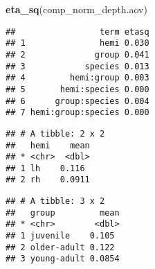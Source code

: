 \documentclass[
]{article}
\newenvironment{Shaded}{\begin{snugshade}}{\end{snugshade}}
\newcommand{\CommentTok}[1]{\textcolor[rgb]{0.56,0.35,0.01}{\textit{#1}}}
\newcommand{\DataTypeTok}[1]{\textcolor[rgb]{0.13,0.29,0.53}{#1}}
\newcommand{\KeywordTok}[1]{\textcolor[rgb]{0.13,0.29,0.53}{\textbf{#1}}}
\newcommand{\NormalTok}[1]{#1}
\newcommand{\OperatorTok}[1]{\textcolor[rgb]{0.81,0.36,0.00}{\textbf{#1}}}
\newcommand{\StringTok}[1]{\textcolor[rgb]{0.31,0.60,0.02}{#1}}
\begin{document}
\begin{Shaded}
\begin{Highlighting}[]
\KeywordTok{eta_sq}\NormalTok{(comp_norm_depth.aov)}
\end{Highlighting}
\end{Shaded}

\begin{verbatim}
##                 term etasq
## 1               hemi 0.030
## 2              group 0.041
## 3            species 0.013
## 4         hemi:group 0.003
## 5       hemi:species 0.000
## 6      group:species 0.004
## 7 hemi:group:species 0.000
\end{verbatim}

\begin{Shaded}
\end{Shaded}

\begin{verbatim}
## # A tibble: 2 x 2
##   hemi    mean
## * <chr>  <dbl>
## 1 lh    0.116 
## 2 rh    0.0911
\end{verbatim}

\begin{Shaded}
\end{Shaded}

\begin{verbatim}
## # A tibble: 3 x 2
##   group         mean
## * <chr>        <dbl>
## 1 juvenile    0.105 
## 2 older-adult 0.122 
## 3 young-adult 0.0854
\end{verbatim}

\begin{Shaded}
\end{Shaded}
\end{document}
